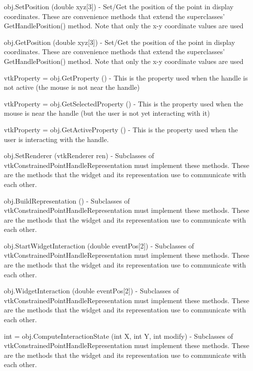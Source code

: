 \begin{DoxyItemize}
\item {\ttfamily obj.\-Set\-Position (double xyz\mbox{[}3\mbox{]})} -\/ Set/\-Get the position of the point in display coordinates. These are convenience methods that extend the superclasses' Get\-Handle\-Position() method. Note that only the x-\/y coordinate values are used  
\item {\ttfamily obj.\-Get\-Position (double xyz\mbox{[}3\mbox{]})} -\/ Set/\-Get the position of the point in display coordinates. These are convenience methods that extend the superclasses' Get\-Handle\-Position() method. Note that only the x-\/y coordinate values are used  
\item {\ttfamily vtk\-Property = obj.\-Get\-Property ()} -\/ This is the property used when the handle is not active (the mouse is not near the handle)  
\item {\ttfamily vtk\-Property = obj.\-Get\-Selected\-Property ()} -\/ This is the property used when the mouse is near the handle (but the user is not yet interacting with it)  
\item {\ttfamily vtk\-Property = obj.\-Get\-Active\-Property ()} -\/ This is the property used when the user is interacting with the handle.  
\item {\ttfamily obj.\-Set\-Renderer (vtk\-Renderer ren)} -\/ Subclasses of vtk\-Constrained\-Point\-Handle\-Representation must implement these methods. These are the methods that the widget and its representation use to communicate with each other.  
\item {\ttfamily obj.\-Build\-Representation ()} -\/ Subclasses of vtk\-Constrained\-Point\-Handle\-Representation must implement these methods. These are the methods that the widget and its representation use to communicate with each other.  
\item {\ttfamily obj.\-Start\-Widget\-Interaction (double event\-Pos\mbox{[}2\mbox{]})} -\/ Subclasses of vtk\-Constrained\-Point\-Handle\-Representation must implement these methods. These are the methods that the widget and its representation use to communicate with each other.  
\item {\ttfamily obj.\-Widget\-Interaction (double event\-Pos\mbox{[}2\mbox{]})} -\/ Subclasses of vtk\-Constrained\-Point\-Handle\-Representation must implement these methods. These are the methods that the widget and its representation use to communicate with each other.  
\item {\ttfamily int = obj.\-Compute\-Interaction\-State (int X, int Y, int modify)} -\/ Subclasses of vtk\-Constrained\-Point\-Handle\-Representation must implement these methods. These are the methods that the widget and its representation use to communicate with each other.  

\end{DoxyItemize}
